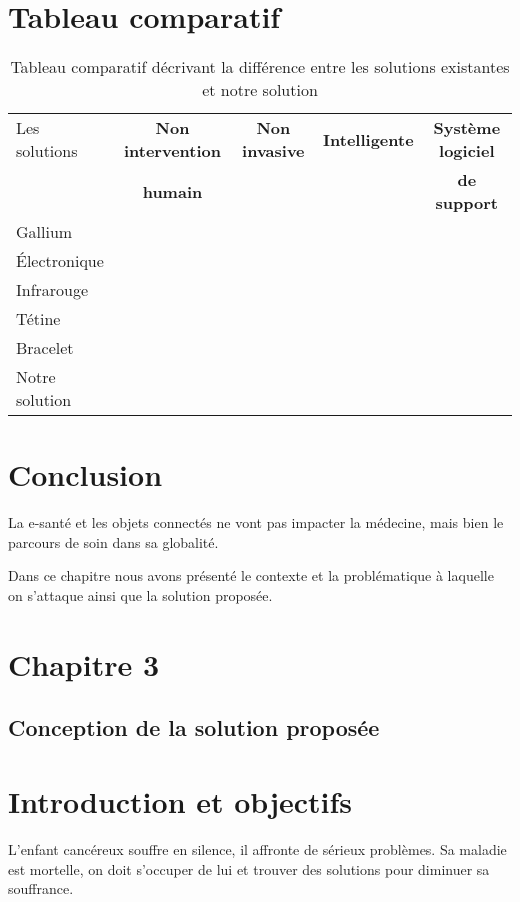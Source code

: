 \documentclass[12pt]{article}
\newcommand{\xmark}{\ding{55}}}
\newcommand{\cmark}{\ding{51}}}
\begin{document}
\section{Tableau comparatif}
\begin{table}[h]
	\centering
	\caption{Tableau comparatif décrivant la différence entre les solutions existantes et notre solution}
	\begin{tabular}{ | l | c | c | c | c |}
		\hline
		{Les solutions} & \bfseries{Non intervention} & \bfseries{Non invasive} & \textbf{Intelligente} & \textbf{Système logiciel}\\ 
								 &  \bfseries{humain}                & 											&									& \textbf{de support}\\
\hline
		Gallium & \xmark & \xmark & \xmark & \xmark \\ \hline
		Électronique & \xmark & \xmark & \xmark & \xmark \\ \hline
		Infrarouge & \xmark & \cmark & \xmark & \xmark \\ \hline
		Tétine & \cmark & \xmark & \cmark & \xmark \\ \hline
		Bracelet & \cmark & \xmark & \cmark & \xmark \\ \hline
		Notre solution & \cmark & \cmark & \cmark & \cmark \\ \hline
	\end{tabular}
\end{table}
\section{Conclusion}
La e-santé et les objets connectés ne vont pas impacter  la médecine, mais bien le parcours de soin dans sa globalité.

Dans ce chapitre nous avons présenté le contexte et la problématique à laquelle on s'attaque ainsi que la solution proposée.

\newpage
\rhead{}
\section*{\Huge{Chapitre 3}}
\subsection*{\huge{Conception de la solution proposée}}
\newpage
{}
\setcounter{section}{0}
\section{Introduction et objectifs}
L'enfant cancéreux souffre en silence, il affronte de sérieux problèmes. Sa maladie est mortelle, on doit s’occuper de lui et trouver des solutions pour diminuer sa souffrance.
\end{document}
